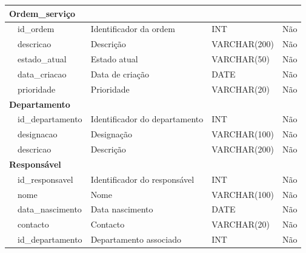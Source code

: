 {\begin{longtable}{p{2.5cm} p{3cm} p{5cm} p{2cm} c}
\midrule
\multicolumn{5}{l}{\textbf{Ordem_serviço}} \\
\midrule
 & id_ordem & Identificador da ordem & INT & Não \\
 & descricao & Descrição & VARCHAR(200) & Não \\
 & estado_atual & Estado atual & VARCHAR(50) & Não \\
 & data_criacao & Data de criação & DATE & Não \\
 & prioridade & Prioridade & VARCHAR(20) & Não \\

\midrule
\multicolumn{5}{l}{\textbf{Departamento}} \\
\midrule
 & id_departamento & Identificador do departamento & INT & Não \\
 & designacao & Designação & VARCHAR(100) & Não \\
 & descricao & Descrição & VARCHAR(200) & Não \\

\midrule
\multicolumn{5}{l}{\textbf{Responsável}} \\
\midrule
 & id_responsavel & Identificador do responsável & INT & Não \\
 & nome & Nome & VARCHAR(100) & Não \\
 & data_nascimento & Data nascimento & DATE & Não \\
 & contacto & Contacto & VARCHAR(20) & Não \\
 & id_departamento & Departamento associado & INT & Não \\

\bottomrule
\end{longtable}
}



